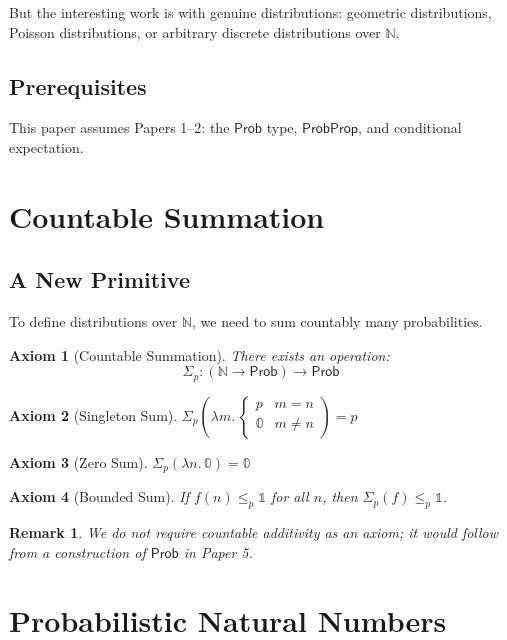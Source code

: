 \documentclass[11pt,a4paper]{article}
\newtheorem{axiom}{Axiom}
\newtheorem{remark}[theorem]{Remark}
\newcommand{\Prob}{\mathsf{Prob}}
\newcommand{\ProbProp}{\mathsf{ProbProp}}
\newcommand{\pzero}{\mathbb{0}}
\newcommand{\pone}{\mathbb{1}}
\newcommand{\ple}{\leq_p}
\newcommand{\psum}{\Sigma_p}
\newcommand{\Nat}{\mathbb{N}}
\begin{document}
But the interesting work is with genuine distributions: geometric distributions, Poisson distributions, or arbitrary discrete distributions over $\Nat$.

\subsection{Prerequisites}

This paper assumes Papers 1--2: the $\Prob$ type, $\ProbProp$, and conditional expectation.

\section{Countable Summation}

\subsection{A New Primitive}

To define distributions over $\Nat$, we need to sum countably many probabilities.

\begin{axiom}[Countable Summation]
There exists an operation:
\[
\psum : (\Nat \to \Prob) \to \Prob
\]
\end{axiom}

\begin{axiom}[Singleton Sum]
$\psum\left(\lambda m.\, \begin{cases} p & m = n \\ \pzero & m \neq n \end{cases}\right) = p$
\end{axiom}

\begin{axiom}[Zero Sum]
$\psum(\lambda n.\, \pzero) = \pzero$
\end{axiom}

\begin{axiom}[Bounded Sum]
If $f(n) \ple \pone$ for all $n$, then $\psum(f) \ple \pone$.
\end{axiom}

\begin{remark}
We do not require countable additivity as an axiom; it would follow from a construction of $\Prob$ in Paper 5.
\end{remark}

\section{Probabilistic Natural Numbers}
\end{document}
